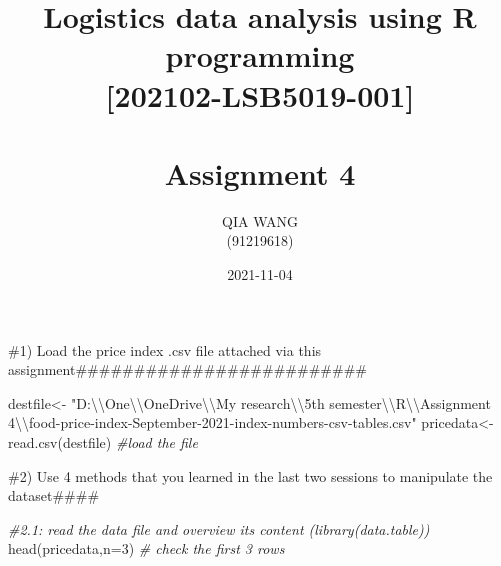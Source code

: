 \documentclass[
  landscape]{article}
\title{Logistics data analysis using R programming\\
{[}202102-LSB5019-001{]}\\
~\\
Assignment 4}
\author{QIA WANG\\
(91219618)}
\date{2021-11-04}
\newenvironment{Shaded}{\begin{snugshade}}{\end{snugshade}}
\newcommand{\AttributeTok}[1]{\textcolor[rgb]{0.77,0.63,0.00}{#1}}
\newcommand{\CommentTok}[1]{\textcolor[rgb]{0.56,0.35,0.01}{\textit{#1}}}
\newcommand{\DecValTok}[1]{\textcolor[rgb]{0.00,0.00,0.81}{#1}}
\newcommand{\FunctionTok}[1]{\textcolor[rgb]{0.00,0.00,0.00}{#1}}
\newcommand{\NormalTok}[1]{#1}
\newcommand{\OtherTok}[1]{\textcolor[rgb]{0.56,0.35,0.01}{#1}}
\newcommand{\SpecialCharTok}[1]{\textcolor[rgb]{0.00,0.00,0.00}{#1}}
\newcommand{\StringTok}[1]{\textcolor[rgb]{0.31,0.60,0.02}{#1}}
\begin{document}
\maketitle

\#1) Load the price index .csv file attached via this
assignment\#\#\#\#\#\#\#\#\#\#\#\#\#\#\#\#\#\#\#\#\#\#\#\#\#

\begin{Shaded}
\begin{Highlighting}[]
\NormalTok{destfile}\OtherTok{\textless{}{-}} \StringTok{"D:}\SpecialCharTok{\textbackslash{}\textbackslash{}}\StringTok{One}\SpecialCharTok{\textbackslash{}\textbackslash{}}\StringTok{OneDrive}\SpecialCharTok{\textbackslash{}\textbackslash{}}\StringTok{My research}\SpecialCharTok{\textbackslash{}\textbackslash{}}\StringTok{5th semester}\SpecialCharTok{\textbackslash{}\textbackslash{}}\StringTok{R}\SpecialCharTok{\textbackslash{}\textbackslash{}}\StringTok{Assignment 4}\SpecialCharTok{\textbackslash{}\textbackslash{}}\StringTok{food{-}price{-}index{-}September{-}2021{-}index{-}numbers{-}csv{-}tables.csv"}
\NormalTok{pricedata}\OtherTok{\textless{}{-}} \FunctionTok{read.csv}\NormalTok{(destfile) }\CommentTok{\#load the file}
\end{Highlighting}
\end{Shaded}

\#2) Use 4 methods that you learned in the last two sessions to
manipulate the dataset\#\#\#\#

\begin{Shaded}
\begin{Highlighting}[]
\CommentTok{\#2.1: read the data file and overview its content (library(data.table))}
\FunctionTok{head}\NormalTok{(pricedata,}\AttributeTok{n=}\DecValTok{3}\NormalTok{) }\CommentTok{\# check the first 3 rows}
\end{Highlighting}
\end{Shaded}
\end{document}
